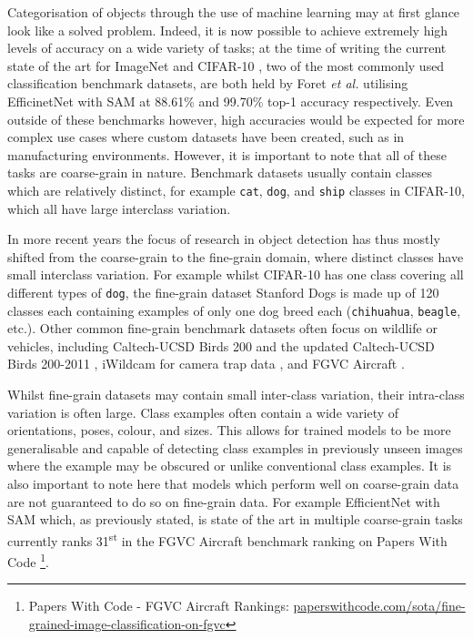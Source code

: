 Categorisation of objects through the use of machine learning may at first glance look like a solved problem. Indeed, it is now possible to achieve extremely high levels of accuracy on a wide variety of tasks; at the time of writing the current state of the art for ImageNet \cite{institute_of_electrical_and_electronics_engineers_2009_2009} and CIFAR-10 \cite{krizhevsky_learning_2009}, two of the most commonly used classification benchmark datasets, are both held by Foret \textit{et al.} utilising EfficinetNet with SAM \cite{foret_sharpness-aware_2020} at 88.61\% and 99.70\% top-1 accuracy respectively. Even outside of these benchmarks however, high accuracies would be expected for more complex use cases where custom datasets have been created, such as in manufacturing environments. However, it is important to note that all of these tasks are coarse-grain in nature. Benchmark datasets usually contain classes which are relatively distinct, for example \texttt{cat}, \texttt{dog}, and \texttt{ship} classes in CIFAR-10, which all have large interclass variation. 

In more recent years the focus of research in object detection has thus mostly shifted from the coarse-grain to the fine-grain domain, where distinct classes have small interclass variation. For example whilst CIFAR-10 has one class covering all different types of \texttt{dog}, the fine-grain dataset Stanford Dogs \cite{khosla_novel_2011} is made up of 120 classes each containing examples of only one dog breed each (\texttt{chihuahua}, \texttt{beagle}, etc.). Other common fine-grain benchmark datasets often focus on wildlife or vehicles, including Caltech-UCSD Birds 200 \cite{welinder_caltech-ucsd_2010} and the updated Caltech-UCSD Birds 200-2011 \cite{wah_caltech-ucsd_2011}, iWildcam for camera trap data \cite{beery_iwildcam_2019}, and FGVC Aircraft \cite{maji_fine-grained_2013}. 

Whilst fine-grain datasets may contain small inter-class variation, their intra-class variation is often large. Class examples often contain a wide variety of orientations, poses, colour, and sizes. This allows for trained models to be more generalisable and capable of detecting class examples in previously unseen images where the example may be obscured or unlike conventional class examples. It is also important to note here that models which perform well on coarse-grain data are not guaranteed to do so on fine-grain data. For example EfficientNet with SAM which, as previously stated, is state of the art in multiple coarse-grain tasks currently ranks 31\textsuperscript{st} in the FGVC Aircraft benchmark ranking on Papers With Code \footnote{Papers With Code - FGVC Aircraft Rankings: \href{https://paperswithcode.com/sota/fine-grained-image-classification-on-fgvc}{paperswithcode.com/sota/fine-grained-image-classification-on-fgvc}}.

